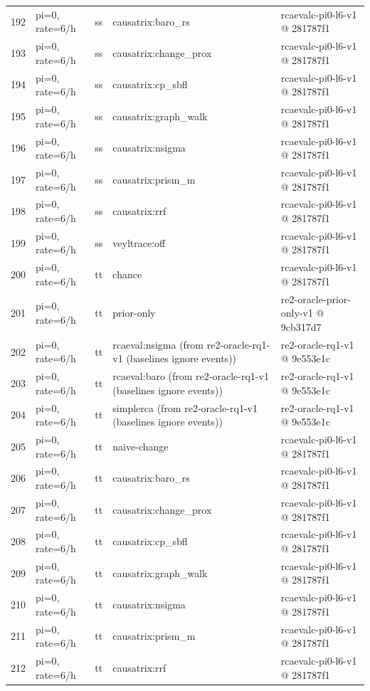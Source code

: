 \begin{longtable}{@{}r>{\raggedright\arraybackslash}p{48.0pt}>{\raggedright\arraybackslash}p{18.0pt}>{\raggedright\arraybackslash}p{108.0pt}>{\raggedright\arraybackslash}p{105.0pt}@{}}
192 & pi=0, rate=6/h & ss & causatrix:baro\_rs & rcaevalc-pi0-l6-v1 @ 281787f1 \\
193 & pi=0, rate=6/h & ss & causatrix:change\_prox & rcaevalc-pi0-l6-v1 @ 281787f1 \\
194 & pi=0, rate=6/h & ss & causatrix:cp\_sbfl & rcaevalc-pi0-l6-v1 @ 281787f1 \\
195 & pi=0, rate=6/h & ss & causatrix:graph\_walk & rcaevalc-pi0-l6-v1 @ 281787f1 \\
196 & pi=0, rate=6/h & ss & causatrix:nsigma & rcaevalc-pi0-l6-v1 @ 281787f1 \\
197 & pi=0, rate=6/h & ss & causatrix:prism\_m & rcaevalc-pi0-l6-v1 @ 281787f1 \\
198 & pi=0, rate=6/h & ss & causatrix:rrf & rcaevalc-pi0-l6-v1 @ 281787f1 \\
199 & pi=0, rate=6/h & ss & veyltrace:off & rcaevalc-pi0-l6-v1 @ 281787f1 \\
200 & pi=0, rate=6/h & tt & chance & rcaevalc-pi0-l6-v1 @ 281787f1 \\
201 & pi=0, rate=6/h & tt & prior-only & re2-oracle-prior-only-v1 @ 9cb317d7 \\
202 & pi=0, rate=6/h & tt & rcaeval:nsigma (from re2-oracle-rq1-v1 (baselines ignore events)) & re2-oracle-rq1-v1 @ 9e553e1c \\
203 & pi=0, rate=6/h & tt & rcaeval:baro (from re2-oracle-rq1-v1 (baselines ignore events)) & re2-oracle-rq1-v1 @ 9e553e1c \\
204 & pi=0, rate=6/h & tt & simplerca (from re2-oracle-rq1-v1 (baselines ignore events)) & re2-oracle-rq1-v1 @ 9e553e1c \\
205 & pi=0, rate=6/h & tt & naive-change & rcaevalc-pi0-l6-v1 @ 281787f1 \\
206 & pi=0, rate=6/h & tt & causatrix:baro\_rs & rcaevalc-pi0-l6-v1 @ 281787f1 \\
207 & pi=0, rate=6/h & tt & causatrix:change\_prox & rcaevalc-pi0-l6-v1 @ 281787f1 \\
208 & pi=0, rate=6/h & tt & causatrix:cp\_sbfl & rcaevalc-pi0-l6-v1 @ 281787f1 \\
209 & pi=0, rate=6/h & tt & causatrix:graph\_walk & rcaevalc-pi0-l6-v1 @ 281787f1 \\
210 & pi=0, rate=6/h & tt & causatrix:nsigma & rcaevalc-pi0-l6-v1 @ 281787f1 \\
211 & pi=0, rate=6/h & tt & causatrix:prism\_m & rcaevalc-pi0-l6-v1 @ 281787f1 \\
212 & pi=0, rate=6/h & tt & causatrix:rrf & rcaevalc-pi0-l6-v1 @ 281787f1 \\

\end{longtable}
